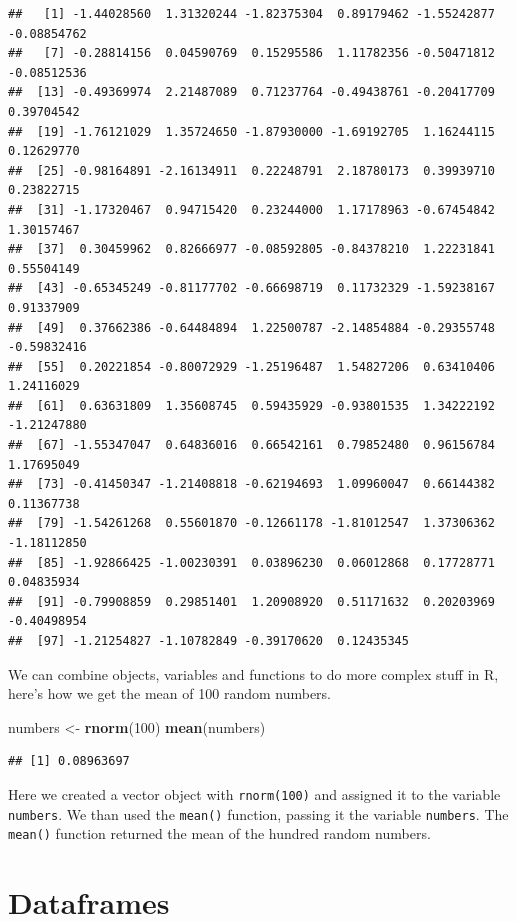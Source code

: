 \documentclass[
]{book}
\newenvironment{Shaded}{\begin{snugshade}}{\end{snugshade}}
\newcommand{\DecValTok}[1]{\textcolor[rgb]{0.00,0.00,0.81}{#1}}
\newcommand{\KeywordTok}[1]{\textcolor[rgb]{0.13,0.29,0.53}{\textbf{#1}}}
\newcommand{\NormalTok}[1]{#1}
\newcommand{\StringTok}[1]{\textcolor[rgb]{0.31,0.60,0.02}{#1}}
\begin{document}
\begin{verbatim}
##   [1] -1.44028560  1.31320244 -1.82375304  0.89179462 -1.55242877 -0.08854762
##   [7] -0.28814156  0.04590769  0.15295586  1.11782356 -0.50471812 -0.08512536
##  [13] -0.49369974  2.21487089  0.71237764 -0.49438761 -0.20417709  0.39704542
##  [19] -1.76121029  1.35724650 -1.87930000 -1.69192705  1.16244115  0.12629770
##  [25] -0.98164891 -2.16134911  0.22248791  2.18780173  0.39939710  0.23822715
##  [31] -1.17320467  0.94715420  0.23244000  1.17178963 -0.67454842  1.30157467
##  [37]  0.30459962  0.82666977 -0.08592805 -0.84378210  1.22231841  0.55504149
##  [43] -0.65345249 -0.81177702 -0.66698719  0.11732329 -1.59238167  0.91337909
##  [49]  0.37662386 -0.64484894  1.22500787 -2.14854884 -0.29355748 -0.59832416
##  [55]  0.20221854 -0.80072929 -1.25196487  1.54827206  0.63410406  1.24116029
##  [61]  0.63631809  1.35608745  0.59435929 -0.93801535  1.34222192 -1.21247880
##  [67] -1.55347047  0.64836016  0.66542161  0.79852480  0.96156784  1.17695049
##  [73] -0.41450347 -1.21408818 -0.62194693  1.09960047  0.66144382  0.11367738
##  [79] -1.54261268  0.55601870 -0.12661178 -1.81012547  1.37306362 -1.18112850
##  [85] -1.92866425 -1.00230391  0.03896230  0.06012868  0.17728771  0.04835934
##  [91] -0.79908859  0.29851401  1.20908920  0.51171632  0.20203969 -0.40498954
##  [97] -1.21254827 -1.10782849 -0.39170620  0.12435345
\end{verbatim}

We can combine objects, variables and functions to do more complex stuff in R, here's how we get the mean of 100 random numbers.

\begin{Shaded}
\begin{Highlighting}[]
\NormalTok{numbers <-}\StringTok{ }\KeywordTok{rnorm}\NormalTok{(}\DecValTok{100}\NormalTok{)}
\KeywordTok{mean}\NormalTok{(numbers)}
\end{Highlighting}
\end{Shaded}

\begin{verbatim}
## [1] 0.08963697
\end{verbatim}

Here we created a vector object with \texttt{rnorm(100)} and assigned it to the variable \texttt{numbers}. We than used the \texttt{mean()} function, passing it the variable \texttt{numbers}. The \texttt{mean()} function returned the mean of the hundred random numbers.

\hypertarget{dataframes}{%
\section{Dataframes}\label{dataframes}}
\end{document}
